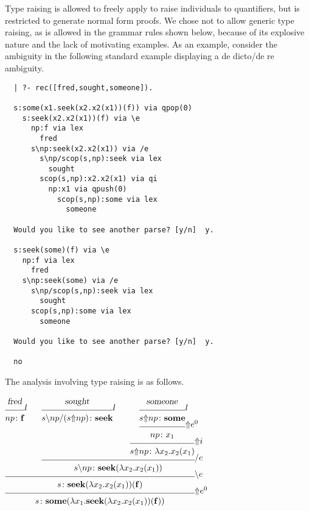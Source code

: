 Type raising is allowed to freely apply to raise individuals to
quantifiers, but is restricted to generate normal form proofs.  We
chose not to allow generic type raising, as is allowed in the grammar
rules shown below, because of its explosive nature and the lack of
motivating examples.  As an example, consider the ambiguity in the
following standard example displaying a de dicto/de re ambiguity.
%
\begin{verbatim}
  | ?- rec([fred,sought,someone]).
  
  s:some(x1.seek(x2.x2(x1))(f)) via qpop(0)
    s:seek(x2.x2(x1))(f) via \e
      np:f via lex
        fred
      s\np:seek(x2.x2(x1)) via /e
        s\np/scop(s,np):seek via lex
          sought
        scop(s,np):x2.x2(x1) via qi
          np:x1 via qpush(0)
            scop(s,np):some via lex
              someone
  
  Would you like to see another parse? [y/n]  y.
  
  s:seek(some)(f) via \e
    np:f via lex
      fred
    s\np:seek(some) via /e
      s\np/scop(s,np):seek via lex
        sought
      scop(s,np):some via lex
        someone
  
  Would you like to see another parse? [y/n]  y.
  
  no
\end{verbatim}
%
The analysis involving type raising is as follows.
%
\begin{center}
\small
$
\infr{\infr{\infr{\men{fred}}
                 {\synsem{np}
                         {\con{f}}}
                 {\lexr}
            \qquad
            \infr{\infr{\men{sought}}
                       {\synsem{\fd{\bk{s}
                                       {np}}
                                   {(\scop{s}
                                          {np})}}
                               {\con{seek}}}
                       {\lexr}
                  \qquad
                  \infr{\infr{\infr{\men{someone}}
                                   {\synsem{\scop{s}
                                                 {np}}
                                           {\con{some}}}
                                   {\lexr}}
                             {\synsem{np}
                                     {x_1}}
                             {\qpush{0}}}
                       {\synsem{\scop{s}
                                     {np}}
                               {\lam{x_2}
                                    {x_2
                                     (x_1)}}}
                       {\qi}}
                 {\synsem{\bk{s}
                             {np}}
                         {\con{seek}
                          (\lam{x_2}
                               {x_2
                                (x_1)})}}
                 {\fel}}
           {\synsem{s}
                   {\con{seek}
                    (\lam{x_2}
                         {x_2
                          (x_1)})
                    (\con{f})}}
           {\bel}}
     {\synsem{s}
             {\con{some}
              (\lam{x_1}
                   {\con{seek}
                    (\lam{x_2}
                         {x_2
                          (x_1)})
                    (\con{f})})}}
     {\qpop{0}}$
\end{center}
